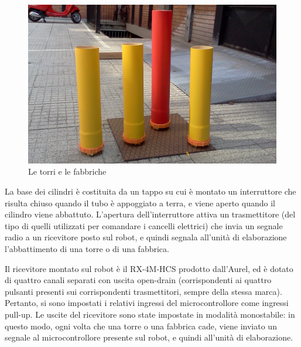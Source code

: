 \begin{figure}
\centering
\includegraphics[scale=0.18]{images/torri}
\caption{Le torri e le fabbriche}
\end{figure}

La base dei cilindri è costituita da un tappo su cui è montato un interruttore che risulta chiuso quando il tubo è appoggiato a terra, e viene aperto quando il cilindro viene abbattuto. L'apertura dell'interruttore attiva un trasmettitore (del tipo di quelli utilizzati per comandare i cancelli elettrici) che invia un segnale radio a un ricevitore posto sul robot, e quindi segnala all'unità di elaborazione l'abbattimento di una torre o di una fabbrica.

Il ricevitore montato sul robot è il RX-4M-HCS prodotto dall'Aurel, ed è dotato di quattro canali separati con uscita open-drain (corrispondenti ai quattro pulsanti presenti sui corrispondenti trasmettitori, sempre della stessa marca). Pertanto, si sono impostati i relativi ingressi del microcontrollore come ingressi pull-up. Le uscite del ricevitore sono state impostate in modalità monostabile: in questo modo, ogni volta che una torre o una fabbrica cade, viene inviato un segnale al microcontrollore presente sul robot, e quindi all'unità di elaborazione.
